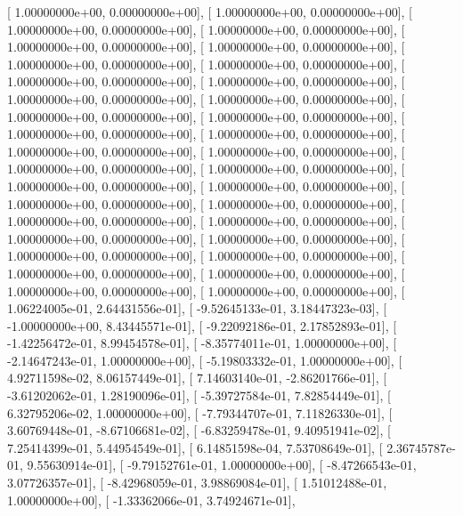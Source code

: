 \documentclass{article}
\begin{document}
       [  1.00000000e+00,   0.00000000e+00],
       [  1.00000000e+00,   0.00000000e+00],
       [  1.00000000e+00,   0.00000000e+00],
       [  1.00000000e+00,   0.00000000e+00],
       [  1.00000000e+00,   0.00000000e+00],
       [  1.00000000e+00,   0.00000000e+00],
       [  1.00000000e+00,   0.00000000e+00],
       [  1.00000000e+00,   0.00000000e+00],
       [  1.00000000e+00,   0.00000000e+00],
       [  1.00000000e+00,   0.00000000e+00],
       [  1.00000000e+00,   0.00000000e+00],
       [  1.00000000e+00,   0.00000000e+00],
       [  1.00000000e+00,   0.00000000e+00],
       [  1.00000000e+00,   0.00000000e+00],
       [  1.00000000e+00,   0.00000000e+00],
       [  1.00000000e+00,   0.00000000e+00],
       [  1.00000000e+00,   0.00000000e+00],
       [  1.00000000e+00,   0.00000000e+00],
       [  1.00000000e+00,   0.00000000e+00],
       [  1.00000000e+00,   0.00000000e+00],
       [  1.00000000e+00,   0.00000000e+00],
       [  1.00000000e+00,   0.00000000e+00],
       [  1.00000000e+00,   0.00000000e+00],
       [  1.00000000e+00,   0.00000000e+00],
       [  1.00000000e+00,   0.00000000e+00],
       [  1.00000000e+00,   0.00000000e+00],
       [  1.00000000e+00,   0.00000000e+00],
       [  1.00000000e+00,   0.00000000e+00],
       [  1.00000000e+00,   0.00000000e+00],
       [  1.00000000e+00,   0.00000000e+00],
       [  1.00000000e+00,   0.00000000e+00],
       [  1.00000000e+00,   0.00000000e+00],
       [  1.00000000e+00,   0.00000000e+00],
       [  1.00000000e+00,   0.00000000e+00],
       [  1.06224005e-01,   2.64431556e-01],
       [ -9.52645133e-01,   3.18447323e-03],
       [ -1.00000000e+00,   8.43445571e-01],
       [ -9.22092186e-01,   2.17852893e-01],
       [ -1.42256472e-01,   8.99454578e-01],
       [ -8.35774011e-01,   1.00000000e+00],
       [ -2.14647243e-01,   1.00000000e+00],
       [ -5.19803332e-01,   1.00000000e+00],
       [  4.92711598e-02,   8.06157449e-01],
       [  7.14603140e-01,  -2.86201766e-01],
       [ -3.61202062e-01,   1.28190096e-01],
       [ -5.39727584e-01,   7.82854449e-01],
       [  6.32795206e-02,   1.00000000e+00],
       [ -7.79344707e-01,   7.11826330e-01],
       [  3.60769448e-01,  -8.67106681e-02],
       [ -6.83259478e-01,   9.40951941e-02],
       [  7.25414399e-01,   5.44954549e-01],
       [  6.14851598e-04,   7.53708649e-01],
       [  2.36745787e-01,   9.55630914e-01],
       [ -9.79152761e-01,   1.00000000e+00],
       [ -8.47266543e-01,   3.07726357e-01],
       [ -8.42968059e-01,   3.98869084e-01],
       [  1.51012488e-01,   1.00000000e+00],
       [ -1.33362066e-01,   3.74924671e-01],
\end{document}
